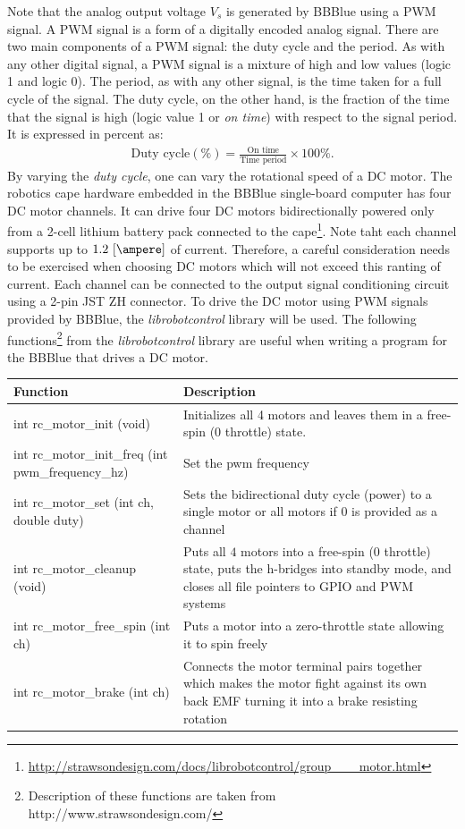 %
Note that the analog output voltage $V_s$ is generated by BBBlue using a PWM signal. A PWM signal is a form of a digitally encoded analog signal. There are two main components of a PWM signal: the duty cycle and the period. As with any other digital signal, a PWM signal is a mixture of high and low values (logic 1 and logic 0). The period, as with any other signal, is the time taken for a full cycle of the signal. The duty cycle, on the other hand, is the fraction of the time that the signal is high (logic value 1 or \emph{on time}) with respect to the signal period. It is expressed in percent as:
%
\begin{align*}
  \text{Duty cycle}(\%) = \frac{\text{On time}}{\text{Time period}}\times 100\%.
\end{align*}
%
By varying the \emph{duty cycle}, one can vary the rotational speed of a DC motor. The robotics cape hardware embedded in the BBBlue single-board computer has four DC motor channels. It can drive four DC motors bidirectionally powered only from a 2-cell lithium battery pack connected to the cape\footnote{\href{http://strawsondesign.com/docs/librobotcontrol/group___motor.html}{http://strawsondesign.com/docs/librobotcontrol/group\_\_\_motor.html}}. Note taht each channel supports up to $1.2~[\ampere]$ of current. Therefore, a careful consideration needs to be exercised when choosing DC motors which will not exceed this ranting of current. Each channel can be connected to the output signal conditioning circuit using a 2-pin JST ZH connector. To drive the DC motor using PWM signals provided by BBBlue, the \emph{librobotcontrol} library will be used. The following functions\footnote{Description of these functions are taken from http://www.strawsondesign.com/} from the \emph{librobotcontrol} library are useful when writing a program for the BBBlue that drives a DC motor. %
%

\begin{tabular}{l|p{3.5in}}
    \toprule
     Function & Description\\
     \toprule
     int 	rc\_motor\_init (void) & Initializes all 4 motors and leaves them in a free-spin (0 throttle) state.\\
     \hline 
     int 	rc\_motor\_init\_freq (int pwm\_frequency\_hz) & Set the pwm frequency\\
     \hline 
    int 	rc\_motor\_set (int ch, double duty) & Sets the bidirectional duty cycle (power) to a single motor or all motors if $0$ is provided as a channel\\
     \hline 
    int 	rc\_motor\_cleanup (void) & Puts all $4$ motors into a free-spin ($0$ throttle) state, puts the h-bridges into standby mode, and closes all file pointers to GPIO and PWM systems\\
     \hline 
    int 	rc\_motor\_free\_spin (int ch) & Puts a motor into a zero-throttle state allowing it to spin freely\\
     \hline 
    int 	rc\_motor\_brake (int ch) & Connects the motor terminal pairs together which makes the motor fight against its own back EMF turning it into a brake resisting rotation\\    
     \bottomrule
\end{tabular}
%

